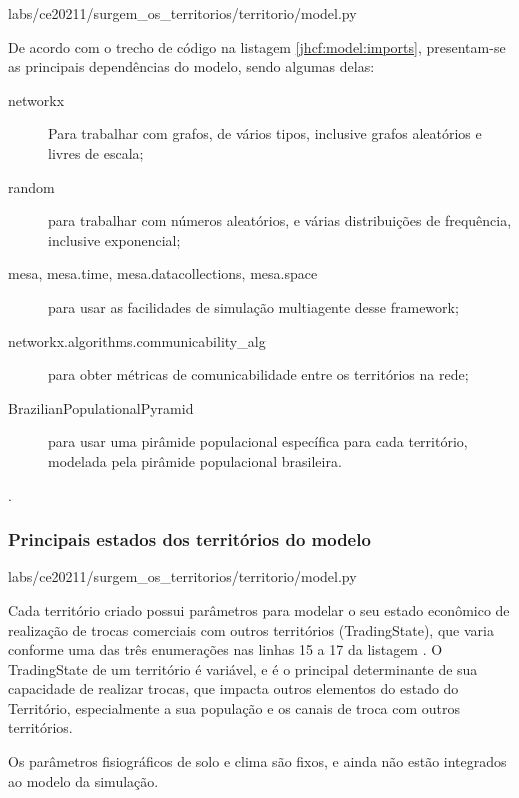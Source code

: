 
{labs/ce20211/surgem_os_territorios/territorio/model.py}

De acordo com o trecho de código na listagem \ref{jhcf:model:imports}, presentam-se as principais dependências do modelo, sendo algumas delas:
\begin{description}
\item [networkx] Para trabalhar com grafos, de vários tipos, inclusive grafos aleatórios e livres de escala;
\item [random] para trabalhar com números aleatórios, e várias distribuições de frequência, inclusive exponencial;
\item [mesa, mesa.time, mesa.datacollections, mesa.space] para usar as facilidades de simulação multiagente desse framework;
\item [networkx.algorithms.communicability\_alg] para obter métricas de comunicabilidade entre os territórios na rede;
\item [BrazilianPopulationalPyramid] para usar uma pirâmide populacional específica para cada território, modelada pela pirâmide populacional brasileira.
\end{description}.

\subsubsection{Principais estados dos territórios do modelo}


{labs/ce20211/surgem_os_territorios/territorio/model.py}

Cada território criado possui parâmetros para modelar 
o seu estado econômico de realização de trocas comerciais com outros territórios (TradingState), que varia conforme uma das três enumerações nas linhas 15 a 17 da listagem \label{jhcf:model:states}. O TradingState de um território é variável, e é o principal determinante de sua capacidade de realizar trocas, que impacta outros elementos do estado do Território, especialmente a sua população e os canais de troca com outros territórios.

Os parâmetros fisiográficos de solo e clima são fixos, e ainda não estão integrados ao modelo da simulação.


